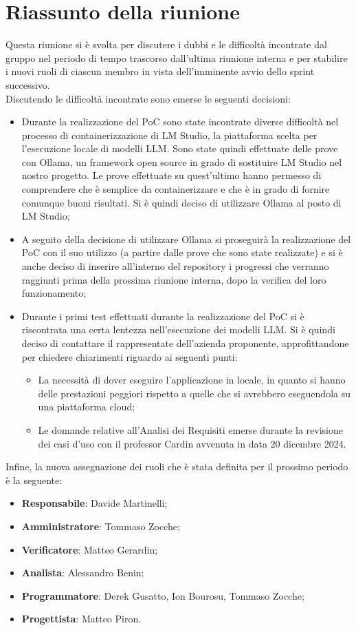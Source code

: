 \section{Riassunto della riunione}
Questa riunione si è svolta per discutere i dubbi e le difficoltà incontrate dal gruppo nel periodo di tempo trascorso dall'ultima riunione interna e per stabilire i nuovi ruoli di ciascun membro in vista dell'imminente avvio dello sprint successivo.\\
Discutendo le difficoltà incontrate sono emerse le seguenti decisioni:
\begin{itemize}
    \item Durante la realizzazione del PoC sono state incontrate diverse difficoltà nel processo di containerizzazione di LM Studio, la piattaforma scelta per l'esecuzione locale di modelli LLM. Sono state quindi effettuate delle prove con Ollama, un framework open source in grado di sostituire LM Studio nel nostro progetto. Le prove effettuate su quest'ultimo hanno permesso di comprendere che è semplice da containerizzare e che è in grado di fornire comunque buoni risultati. Si è quindi deciso di utilizzare Ollama al posto di LM Studio;
    \item A seguito della decisione di utilizzare Ollama si proseguirà la realizzazione del PoC con il suo utilizzo (a partire dalle prove che sono state realizzate) e si è anche deciso di inserire all'interno del repository i progressi che verranno raggiunti prima della prossima riunione interna, dopo la verifica del loro funzionamento;
    \item Durante i primi test effettuati durante la realizzazione del PoC si è riscontrata una certa lentezza nell'esecuzione dei modelli LLM. Si è quindi deciso di contattare il rappresentate dell'azienda proponente, approfittandone per chiedere chiarimenti riguardo ai seguenti punti:
    \begin{itemize}
        \item La necessità di dover eseguire l'applicazione in locale, in quanto si hanno delle prestazioni peggiori rispetto a quelle che si avrebbero eseguendola su una piattaforma cloud;
        \item Le domande relative all'Analisi dei Requisiti emerse durante la revisione dei casi d'uso con il professor Cardin avvenuta in data 20 dicembre 2024.
    \end{itemize}
\end{itemize}
Infine, la nuova assegnazione dei ruoli che è stata definita per il prossimo periodo è la seguente:
 \begin{itemize}
    \item \textbf{Responsabile}: Davide Martinelli;
    \item \textbf{Amministratore}: Tommaso Zocche;
    \item \textbf{Verificatore}: Matteo Gerardin;
    \item \textbf{Analista}: Alessandro Benin;
    \item \textbf{Programmatore}: Derek Gusatto, Ion Bourosu, Tommaso Zocche;
    \item \textbf{Progettista}: Matteo Piron.
\end{itemize}